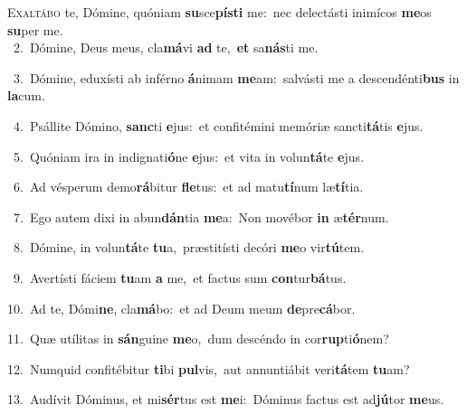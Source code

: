 \lettrine{\initial\textcolor{\initialcolor}{E}}{xaltábo} te, Dómine, quóniam \textbf{su}\-sce\-\textbf{pís}\-\textbf{ti} me:~\star nec delectásti inimícos \textbf{me}\-os \textbf{su}\-per me.\\
{\numbfont\textcolor{\numbcolor}{~2.}}~Dómine, Deus meus, cla\-\textbf{má}\-vi \textbf{ad} te,~\star \textbf{et} sa\-\textbf{nás}\-ti me.\par
{\numbfont\textcolor{\numbcolor}{~3.}}~Dómine, eduxísti ab inférno \textbf{á}\-nimam \textbf{me}\-am:~\star salvásti me a descendénti\textbf{bus} in \textbf{la}\-cum.\par
{\numbfont\textcolor{\numbcolor}{~4.}}~Psállite Dómino, \textbf{sanc}\-ti \textbf{e}\-jus:~\star et confitémini memóriæ sancti\-\textbf{tá}\-tis \textbf{e}\-jus.\par
{\numbfont\textcolor{\numbcolor}{~5.}}~Quóniam ira in indignati\-\textbf{ó}\-ne \textbf{e}\-jus:~\star et vita in volun\-\textbf{tá}\-te \textbf{e}\-jus.\par
{\numbfont\textcolor{\numbcolor}{~6.}}~Ad vésperum demo\-\textbf{rá}\-bitur \textbf{fle}\-tus:~\star et ad matu\-\textbf{tí}\-num læ\-\textbf{tí}\-tia.\par
{\numbfont\textcolor{\numbcolor}{~7.}}~Ego autem dixi in abun\-\textbf{dán}\-tia \textbf{me}\-a:~\star Non movébor \textbf{in} æ\-\textbf{tér}\-num.\par
{\numbfont\textcolor{\numbcolor}{~8.}}~Dómine, in volun\-\textbf{tá}\-te \textbf{tu}\-a,~\star præstitísti decóri \textbf{me}\-o vir\-\textbf{tú}\-tem.\par
{\numbfont\textcolor{\numbcolor}{~9.}}~Avertísti fáciem \textbf{tu}\-am \textbf{a} me,~\star et factus sum \textbf{con}\-tur\-\textbf{bá}\-tus.\par
{\numbfont\textcolor{\numbcolor}{10.}}~Ad te, Dómi\-\textbf{ne}\-, cla\-\textbf{má}\-bo:~\star et ad Deum meum \textbf{de}\-pre\-\textbf{cá}\-bor.\par
{\numbfont\textcolor{\numbcolor}{11.}}~Quæ utílitas in \textbf{sán}\-guine \textbf{me}\-o,~\star dum descéndo in cor\-\textbf{rup}\-ti\-\textbf{ó}\-nem?\par
{\numbfont\textcolor{\numbcolor}{12.}}~Numquid confitébitur \textbf{ti}\-bi \textbf{pul}\-vis,~\star aut annuntiábit veri\-\textbf{tá}\-tem \textbf{tu}\-am?\par
{\numbfont\textcolor{\numbcolor}{13.}}~Audívit Dóminus, et mi\-\textbf{sér}\-tus est \textbf{me}\-i:~\star Dóminus factus est ad\-\textbf{jú}\-tor \textbf{me}\-us.\par
